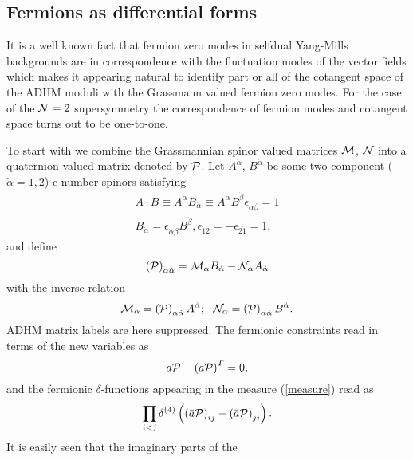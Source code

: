 \documentclass[a4paper,12pt]{article}
\begin{document}
\subsection{Fermions as differential forms}

It is a well known fact that fermion zero modes in selfdual Yang-Mills 
backgrounds are in correspondence with the fluctuation modes of the 
vector fields which makes it appearing natural to identify part or 
all of the cotangent space of the ADHM moduli with the Grassmann 
valued fermion zero modes. For 
the case of the ${\cal N}=2$ supersymmetry the correspondence of 
fermion modes and cotangent space turns out to be one-to-one. 

To start with we combine the Grassmannian spinor valued matrices 
${\cal M}$, ${\cal N}$ into a quaternion valued matrix denoted by 
${\cal P}$. Let $A^{\dot{\alpha}}$, $B^{\dot{\alpha}}$ be some 
two component ($\dot{\alpha}=1,2$) c-number spinors satisfying 
\begin{eqnarray}
A\cdot B\equiv A^{\dot{\alpha}} B_{\dot{\alpha}} \equiv 
A^{\dot{\alpha}} B^{\dot{\beta}} \epsilon_{\dot{\alpha}\dot{\beta}} 
=1 \nonumber \\
B_{\dot{\alpha}}=\epsilon_{\dot{\alpha}\dot{\beta}}
B^{\dot{\beta}}, \epsilon_{\dot{1}\dot{2}}=-\epsilon_{\dot{2}\dot{1}} 
=1, \nonumber
\end{eqnarray}
and define 
\begin{equation}
\left({\cal P}\right)_{\alpha \dot{\alpha}}={\cal M}_{\alpha} 
B_{\dot{\alpha}}-{\cal N}_{\alpha}A_{\dot{\alpha}}
\end{equation}
with the inverse relation
\begin{equation}
{\cal M}_{\alpha}=\left({\cal P}\right)_{\alpha \dot{\alpha}} 
A^{\dot{\alpha}}; \, \, \, \,
{\cal N}_{\alpha}=\left({\cal P}\right)_{\alpha \dot{\alpha}} 
B^{\dot{\alpha}}.
\end{equation}   
ADHM matrix labels are here suppressed. The fermionic constraints 
read in terms of the new variables as 
\begin{equation}
\bar{a}{\cal P}-\left(\bar{a}{\cal P}\right)^T=0,
\label{newfermconstraint}
\end{equation}
and the fermionic $\delta$-functions appearing in the measure 
(\ref{measure}) read as 
\begin{equation}
\prod_{i<j}\delta^{(4)}\left(\left(\bar{a}{\cal P}\right)_{ij}-
\left(\bar{a}{\cal P}\right)_{ji}\right). 
\label{fermdelta}
\end{equation}
It is easily seen that the imaginary parts of the 
\end{document}
